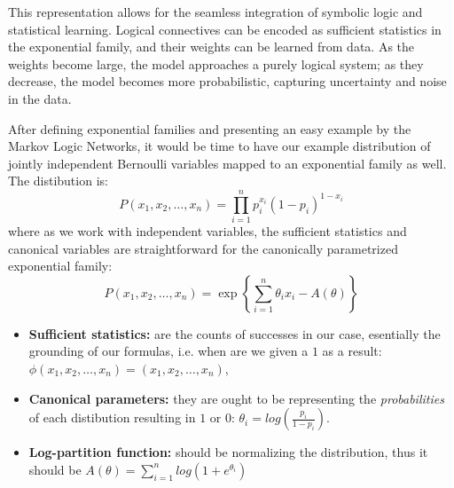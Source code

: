 \documentclass[encoding=utf8,british]{tumphthesis}
\begin{document}
            This representation allows for the seamless integration of symbolic logic and statistical learning. Logical connectives 
            can be encoded as sufficient statistics in the exponential family, and their weights can be learned from data. As the 
            weights become large, the model approaches a purely logical system; as they decrease, the model becomes more probabilistic, 
            capturing uncertainty and noise in the data.

            \begin{tcolorbox}[breakable, width=\linewidth, sharp corners=all, colback=white!95!black]
                After defining exponential families and presenting an easy example by the Markov Logic Networks, it would be time to 
                have our example distribution of jointly independent Bernoulli variables mapped to an exponential family as well. 
                \\
                The distibution is:
                \begin{equation*}
                    P(x_1, x_2, \dots , x_n) = \prod_{i = 1}^n p_i^{x_i}(1-p_i)^{1-x_i}
                \end{equation*}
                where as we work with independent variables, the sufficient statistics and canonical variables are straightforward for the 
                canonically parametrized exponential family:
                \begin{equation*}
                    P(x_1, x_2, \dots , x_n) = \exp\left\{\sum_{i=1}^n \theta_i x_i - A(\theta)\right\}
                \end{equation*}
                \begin{itemize}
                    \item \textbf{Sufficient statistics:} are the counts of successes in our case, esentially the grounding of our formulas, i.e. when are we given a 
                    $1$ as a result: $\phi(x_1, x_2, \dots , x_n) = (x_1, x_2, \dots , x_n)$,
                    \item \textbf{Canonical parameters:} they are ought to be representing the \textit{probabilities} of each distibution resulting in $1$ or $0$:
                    $\theta_i = log \left(\frac{p_i}{1 - p_i}\right)$.
                    \item \textbf{Log-partition function:} should be normalizing the distribution, thus it should be $A(\theta) = \sum_{i=1}^n log( 1 + e^{\theta_i})$
                \end{itemize}

\end{tcolorbox}
\end{document}
